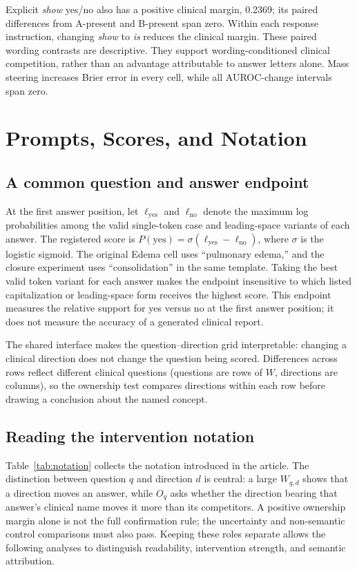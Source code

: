\documentclass{article}
\begin{document}
Explicit \textit{show} yes/no also has a positive clinical margin, 0.2369; its paired differences from A-present and B-present span zero. Within each response instruction, changing \textit{show} to \textit{is} reduces the clinical margin. These paired wording contrasts are descriptive. They support wording-conditioned clinical competition, rather than an advantage attributable to answer letters alone. Mass steering increases Brier error in every cell, while all AUROC-change intervals span zero.

\FloatBarrier
\section{Prompts, Scores, and Notation}
\label{app:protocol}

\subsection{A common question and answer endpoint}

At the first answer position, let $\ell_{\mathrm{yes}}$ and
$\ell_{\mathrm{no}}$ denote the maximum log probabilities among the valid
single-token case and leading-space variants of each answer.  The registered
score is $P(\mathrm{yes})=\sigma(\ell_{\mathrm{yes}}-\ell_{\mathrm{no}})$,
where $\sigma$ is the logistic sigmoid. The original Edema cell uses ``pulmonary
edema,'' and the closure experiment uses ``consolidation'' in the same
template. Taking the best valid token variant for each answer makes the
endpoint insensitive to which listed capitalization or leading-space form
receives the highest score. This endpoint measures the relative support for
yes versus no at the first answer position; it does not measure the accuracy
of a generated clinical report.


The shared interface makes the question--direction grid interpretable:
changing a clinical direction does not change the question being scored.
Differences across rows reflect different clinical questions (questions are
rows of $W$, directions are columns), so the ownership test compares directions
within each row before drawing a conclusion about the named concept.

\subsection{Reading the intervention notation}

Table~\ref{tab:notation} collects the notation introduced in the article.
The distinction between question $q$ and direction $d$ is central: a large
$W_{q,d}$ shows that a direction moves an answer, while $O_q$ asks whether
the direction bearing that answer's clinical name moves it more than its
competitors. A positive ownership margin alone is not the full confirmation
rule; the uncertainty and non-semantic control comparisons must also pass.
Keeping these roles separate allows the following analyses to distinguish
readability, intervention strength, and semantic attribution.
\end{document}
